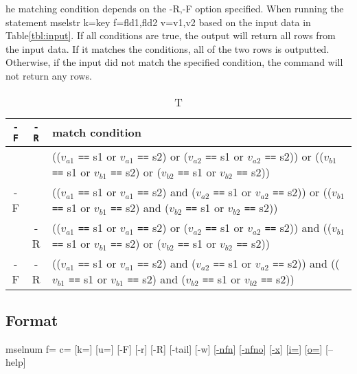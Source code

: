 \documentclass[a4paper]{jarticle}
\begin{document}
\begin{table}[htbp]
\begin{center}
\caption The matching condition depends on the -R,-F option specified. 
When running the statement mselstr k=key f=fld1,fld2 v=v1,v2 based on the input data in {Table\ref{tbl:input}.
If all conditions are true, the output will return all rows from the input data. 
If it matches the conditions, all of the two rows is outputted. Otherwise, if the input did not match the specified condition, the command will not return any rows. \label{tbl:cond}}

{\small
\begin{tabular}{ccl}
\hline
\verb|-F| & \verb|-R| & match condition \\
\hline
   &    &
(($v_{a1}$ \verb|==| s1 or $v_{a1}$ \verb|==| s2)  or
 ($v_{a2}$ \verb|==| s1 or $v_{a2}$ \verb|==| s2)) or
(($v_{b1}$ \verb|==| s1 or $v_{b1}$ \verb|==| s2)  or
 ($v_{b2}$ \verb|==| s1 or $v_{b2}$ \verb|==| s2)) \\
-F &    &
(($v_{a1}$ \verb|==| s1 or $v_{a1}$ \verb|==| s2)  and
 ($v_{a2}$ \verb|==| s1 or $v_{a2}$ \verb|==| s2)) or
(($v_{b1}$ \verb|==| s1 or $v_{b1}$ \verb|==| s2)  and
 ($v_{b2}$ \verb|==| s1 or $v_{b2}$ \verb|==| s2)) \\
   & -R & 
(($v_{a1}$ \verb|==| s1 or $v_{a1}$ \verb|==| s2)  or
 ($v_{a2}$ \verb|==| s1 or $v_{a2}$ \verb|==| s2)) and
(($v_{b1}$ \verb|==| s1 or $v_{b1}$ \verb|==| s2)  or
 ($v_{b2}$ \verb|==| s1 or $v_{b2}$ \verb|==| s2)) \\
-F & -R & 
(($v_{a1}$ \verb|==| s1 or $v_{a1}$ \verb|==| s2)  and
 ($v_{a2}$ \verb|==| s1 or $v_{a2}$ \verb|==| s2)) and
(($v_{b1}$ \verb|==| s1 or $v_{b1}$ \verb|==| s2)  and
 ($v_{b2}$ \verb|==| s1 or $v_{b2}$ \verb|==| s2)) \\
\hline
\end{tabular}
}

\end{center}
\end{table}

\subsection*{Format}
mselnum f= c= [k=]  [u=] [-F] [-r] [-R] [-tail] [-w]
[\href{run:option.pdf}{-nfn}]
[\href{run:option.pdf}{-nfno}]
[\href{run:option.pdf}{-x}]
[\href{run:option.pdf}{i=}]
[\href{run:option.pdf}{o=}]
[--help]\\
\end{document}
